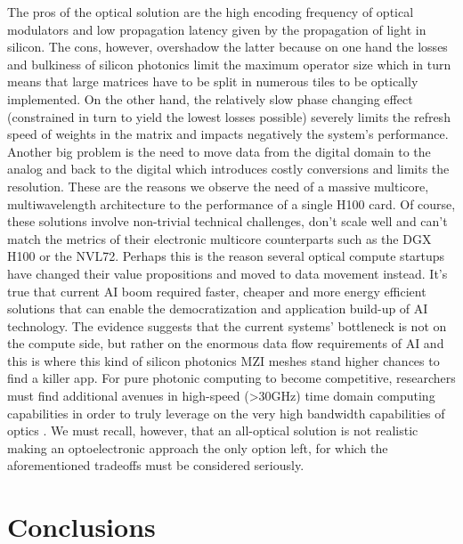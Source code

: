 The pros of the optical solution are the high encoding frequency of optical modulators and low propagation latency given by the propagation of light in silicon.
The cons, however, overshadow the latter because on one hand the losses and bulkiness of silicon photonics limit the maximum operator size which in turn means that large matrices have to be split in numerous tiles to be optically implemented.
On the other hand, the relatively slow phase changing effect (constrained in turn to yield the lowest losses possible) severely limits the refresh speed of weights in the matrix and impacts negatively the system's performance.
Another big problem is the need to move data from the digital domain to the analog and back to the digital \cite{meech_data_2023} which introduces costly conversions and limits the resolution.
These are the reasons we observe the need of a massive multicore, multiwavelength architecture to the performance of a single H100 card.
Of course, these solutions involve non-trivial technical challenges, don't scale well and can't match the metrics of their electronic multicore counterparts such as the DGX H100 or the NVL72.
Perhaps this is the reason several optical compute startups have changed their value propositions and moved to data movement instead.
It's true that current AI boom required faster, cheaper and more energy efficient solutions that can enable the democratization and application build-up of AI technology.
The evidence suggests that the current systems' bottleneck is not on the compute side, but rather on the enormous data flow requirements of AI \cite{cole_optical_2021} and this is where this kind of silicon photonics MZI meshes stand higher chances to find a killer app.
For pure photonic computing to become competitive, researchers must find additional avenues in high-speed (>30GHz) time domain computing capabilities in order to truly leverage on the very high bandwidth capabilities of optics \cite{tsakyridis_photonic_2024}.
We must recall, however, that an all-optical solution is not realistic making an optoelectronic approach the only option left, for which the aforementioned tradeoffs must be considered seriously.
\section{Conclusions}\label{sec:conclusions} %

